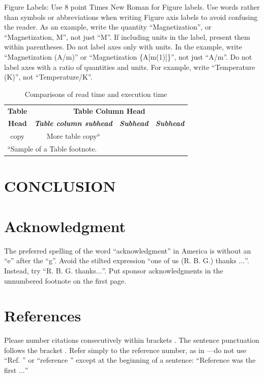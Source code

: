 \documentclass[conference]{IEEEtran}
\begin{document}
Figure Labels: Use 8 point Times New Roman for Figure labels. Use words 
rather than symbols or abbreviations when writing Figure axis labels to 
avoid confusing the reader. As an example, write the quantity 
``Magnetization'', or ``Magnetization, M'', not just ``M''. If including 
units in the label, present them within parentheses. Do not label axes only 
with units. In the example, write ``Magnetization (A/m)'' or ``Magnetization 
\{A[m(1)]\}'', not just ``A/m''. Do not label axes with a ratio of 
quantities and units. For example, write ``Temperature (K)'', not 
``Temperature/K''.


\begin{table}[htbp]
	\caption{Comparisons of read time and execution time}
	\begin{center}
		\begin{tabular}{|c|c|c|c|}
			\hline
			\textbf{Table}&\multicolumn{3}{|c|}{\textbf{Table Column Head}} \\
			\cline{2-4} 
			\textbf{Head} & \textbf{\textit{Table column subhead}}& \textbf{\textit{Subhead}}& \textbf{\textit{Subhead}} \\
			\hline
			copy& More table copy$^{\mathrm{a}}$& &  \\
			\hline
			\multicolumn{4}{l}{$^{\mathrm{a}}$Sample of a Table footnote.}
		\end{tabular}
		\label{tab1}
	\end{center}
\end{table}


\section{CONCLUSION}

\section*{Acknowledgment}

The preferred spelling of the word ``acknowledgment'' in America is without 
an ``e'' after the ``g''. Avoid the stilted expression ``one of us (R. B. 
G.) thanks $\ldots$''. Instead, try ``R. B. G. thanks$\ldots$''. Put sponsor 
acknowledgments in the unnumbered footnote on the first page.

\section*{References}

Please number citations consecutively within brackets \cite{b1}. The 
sentence punctuation follows the bracket \cite{b2}. Refer simply to the reference 
number, as in \cite{b3}---do not use ``Ref. \cite{b3}'' or ``reference \cite{b3}'' except at 
the beginning of a sentence: ``Reference \cite{b3} was the first $\ldots$''
\end{document}
